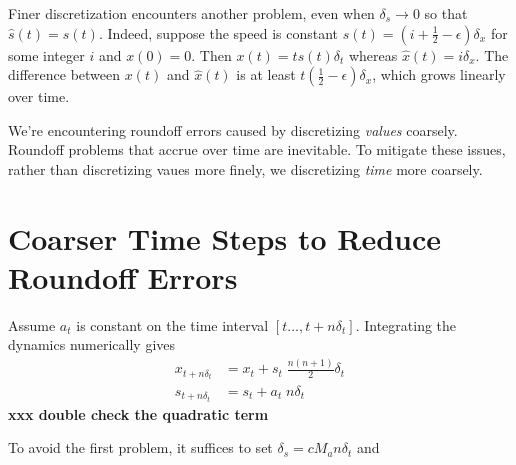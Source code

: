 \documentclass{article}
\begin{document}
Finer discretization encounters another problem, even when
$\delta_s\to 0$ so that $\hat{s}(t)=s(t)$. Indeed, suppose the speed
is constant $s(t) = (i+\tfrac{1}{2}-\epsilon) \delta_x$ for some
integer $i$ and $x(0)=0$.  Then $x(t) = t s(t) \delta_t$ whereas
$\hat{x}(t) = i \delta_x$. The difference between $x(t)$ and
$\hat{x}(t)$ is at least $t (\tfrac{1}{2}-\epsilon)\delta_x$, which
grows linearly over time.

We're encountering roundoff errors caused by discretizing {\it values}
coarsely. Roundoff problems that accrue over time are inevitable. To
mitigate these issues, rather than discretizing vaues more finely, we
discretizing {\it time} more coarsely.

\section{Coarser Time Steps to Reduce Roundoff Errors}

Assume $a_t$ is constant on the time interval $[t\ldots,t+n\delta_t]$.
Integrating the dynamics numerically gives
\begin{eqnarray*}
  x_{t+n \delta_t} &= x_t + s_t \; \tfrac{n(n+1)}{2} \delta_t \\
  s _{t+n \delta_t } &= s _t + a _t \;n \delta_t
\end{eqnarray*}
{\bf xxx double check the quadratic term}

To avoid the first problem, it suffices to set $\delta_s = c M_a n \delta_t$ and $$
\end{document}
